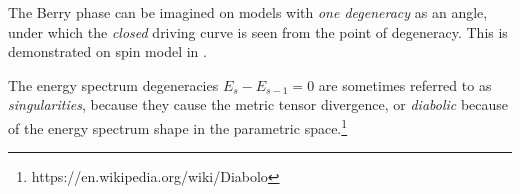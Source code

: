 The Berry phase can be imagined on models with \emph{one degeneracy} as an angle, under which the \emph{closed} driving curve is seen from the point of degeneracy. This is demonstrated on spin model in \citep{berry1984}.

The energy spectrum degeneracies $E_s-E_{s-1}=0$ are sometimes referred to as \emph{singularities}, because they cause the metric tensor divergence, or \emph{diabolic} because of the energy spectrum shape in the parametric space.\footnote{https://en.wikipedia.org/wiki/Diabolo}
